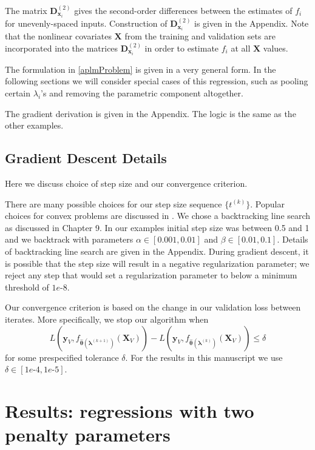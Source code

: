 \documentclass{statsoc}
\begin{document}
The matrix $\boldsymbol{D}^{(2)}_{\boldsymbol{x}_i}$ gives the second-order differences between the estimates of $f_i$ for unevenly-spaced inputs. Construction of $\boldsymbol{D}^{(2)}_{\boldsymbol{x}_i}$ is given in the Appendix. Note that the nonlinear covariates $\boldsymbol X$ from the training and validation sets are incorporated into the matrices $\boldsymbol{D}^{(2)}_{\boldsymbol{x}_i}$ in order to estimate $f_i$ at all $\boldsymbol X$ values.

The formulation in \eqref{aplmProblem} is given in a very general form. In the following sections we will consider special cases of this regression, such as pooling certain $\lambda_i$'s and removing the parametric component altogether.

The gradient derivation is given in the Appendix. The logic is the same as the other examples.

\subsection{Gradient Descent Details}\label{sec:alg_details}
Here we discuss choice of step size and our convergence criterion.

There are many possible choices for our step size sequence $\{t^{(k)}\}$. Popular choices for convex problems are discussed in \citet{boyd2004convex}. We chose a backtracking line search as discussed in Chapter 9. In our examples initial step size was between 0.5 and 1 and we backtrack with parameters $\alpha \in [0.001, 0.01]$ and $\beta \in [0.01, 0.1]$. Details of backtracking line search are given in the Appendix. During gradient descent, it is possible that the step size will result in a negative regularization parameter; we reject any step that would set a regularization parameter to below a minimum threshold of $1e$-8.

Our convergence criterion is based on the change in our validation loss between iterates. More specifically, we stop our algorithm when
\[
L \left( \boldsymbol{y}_V, f_{\hat{\boldsymbol \theta}(\boldsymbol{\lambda}^{(k+1)})}(\boldsymbol{X}_V)\right) -
L \left( \boldsymbol{y}_V, f_{\hat{\boldsymbol \theta}(\boldsymbol{\lambda}^{(k)})}(\boldsymbol{X}_V)\right) \leq \delta
\]
for some prespecified tolerance $\delta$. For the results in this manuscript we use $\delta \in [1e\text{-}4, 1e\text{-}5]$.

\section{Results: regressions with two penalty parameters}\label{sec:results1}\label{results1}
\end{document}
